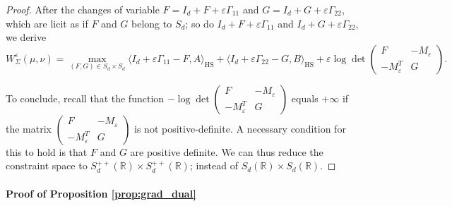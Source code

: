 \documentclass[]{article}
\DeclareMathOperator{\HS}{HS}
\numberwithin{equation}{section}
\theoremstyle{plain}
\begin{document}
{\begin{proof}
	
	After the changes of variable $F = I_d+F+\varepsilon \Gamma_{11}$ and $G = I_d+G+\varepsilon \Gamma_{22}$, which are licit as if $F$ and $G$ belong to $S_d$; so do $I_d+F+\varepsilon \Gamma_{11}$ and $I_d + G + \varepsilon \Gamma_{22}$, we derive 
	\begin{equation}
		W_\Sigma^\varepsilon(\mu, \nu) = \max_{(F,G) \in S_d \times S_d}  \langle I_d + \varepsilon \Gamma_{11} - F, A \rangle_{\HS} + \langle I_d + \varepsilon \Gamma_{22} -G, B \rangle_{\HS} +   \varepsilon \log  \det \begin{pmatrix}
			F   & -M_{\varepsilon}   \\
			-M_{\varepsilon}^T&    G 
		\end{pmatrix}.
	\end{equation}
	
	To conclude, recall that the function $-\log \det\begin{pmatrix}
		F   & -M_{\varepsilon}    \\
		-M_{\varepsilon}^T&    G 
	\end{pmatrix}$ equals $+\infty$ if the matrix $\begin{pmatrix}
		F   & -M_{\varepsilon}    \\
		-M_{\varepsilon}^T&    G 
	\end{pmatrix}$ is not positive-definite. A necessary condition for this to hold is that $F$ and $G$ are positive definite. We can thus reduce the constraint space to $S_d^{++}(\mathbb{R}) \times S_d^{++}(\mathbb{R})$; instead of $S_d(\mathbb{R}) \times S_d(\mathbb{R})$.
\end{proof}

\paragraph{Proof of Proposition \ref{prop:grad_dual}}

}
\end{document}
